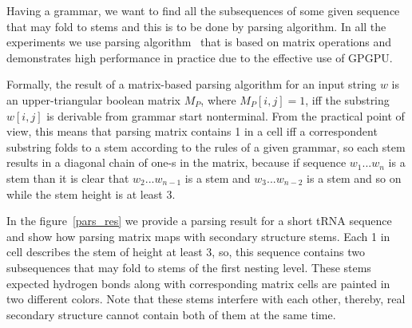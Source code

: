 \documentclass[runningheads]{llncs}
\begin{document}
Having a grammar, we want to find all the subsequences of some given sequence that may fold to stems and this is to be done by parsing algorithm. In all the experiments we use parsing algorithm~\cite{Azimov:2018:CPQ:3210259.3210264} that is based on matrix operations and demonstrates high performance in practice due to the effective use of GPGPU. 

Formally, the result of a matrix-based parsing algorithm for an input string $w$ is an upper-triangular boolean matrix $M_P$, where $M_P [i,j] = 1$, iff the substring $w[i,j]$ is derivable from grammar start nonterminal. From the practical point of view, this means that parsing matrix contains 1 in a cell iff a correspondent substring folds to a stem according to the rules of a given grammar, so each stem results in a diagonal chain of one-s in the matrix, because if sequence $w_1...w_n$ is a stem than it is clear that $w_2...w_{n - 1}$ is a stem and $w_3...w_{n - 2}$ is a stem and so on while the stem height is at least 3.

In the figure~\ref{pars_res} we provide a parsing result for a short tRNA sequence and show how parsing matrix maps with secondary structure stems. Each 1 in cell describes the stem of height at least 3, so, this sequence contains two subsequences that may fold to stems of the first nesting level. These stems expected hydrogen bonds along with corresponding matrix cells are painted in two different colors. Note that these stems interfere with each other, thereby, real secondary structure cannot contain both of them at the same time.
\end{document}
